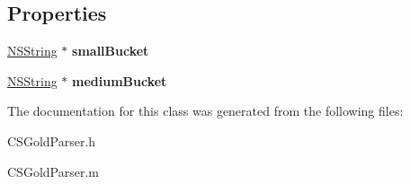 \subsection*{Properties}
\begin{DoxyCompactItemize}
\item 
\hypertarget{interface_c_s_gold_parser_aa32e96bf1b72f4fad4fb32516c95d271}{
\hyperlink{class_n_s_string}{NSString} $\ast$ {\bfseries smallBucket}}
\label{interface_c_s_gold_parser_aa32e96bf1b72f4fad4fb32516c95d271}

\item 
\hypertarget{interface_c_s_gold_parser_a804aaaae4fe785b6c96760806d35c0b2}{
\hyperlink{class_n_s_string}{NSString} $\ast$ {\bfseries mediumBucket}}
\label{interface_c_s_gold_parser_a804aaaae4fe785b6c96760806d35c0b2}

\end{DoxyCompactItemize}


The documentation for this class was generated from the following files:\begin{DoxyCompactItemize}
\item 
CSGoldParser.h\item 
CSGoldParser.m\end{DoxyCompactItemize}

